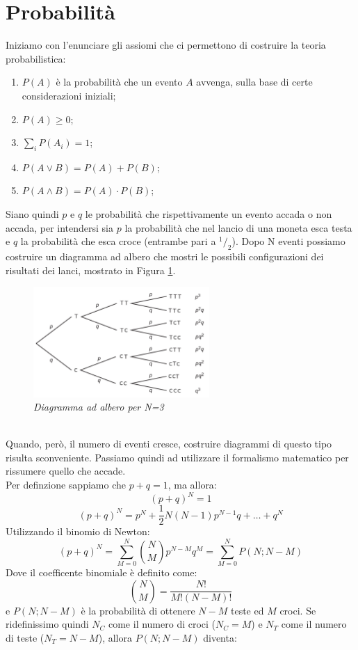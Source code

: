 \section{Probabilità}

Iniziamo con l'enunciare gli assiomi che ci permettono di costruire la teoria probabilistica:
\begin{enumerate}
    \item $P(A)$ è la probabilità che un evento $A$ avvenga, sulla base di certe considerazioni iniziali;
    \item $P(A)\geq 0$;
    \item $\sum_i P(A_i) = 1$;
    \item $P(A \lor B) = P(A) + P(B)$;
    \item $P(A \land B) = P(A) \cdot P(B)$;
\end{enumerate}
Siano quindi $p$ e $q$ le probabilità che rispettivamente un evento accada o non accada, per intendersi sia $p$ la probabilità che nel lancio di una moneta esca testa e $q$ la probabilità che esca croce (entrambe pari a $ ^1/_2$). Dopo N eventi possiamo costruire un diagramma ad albero che mostri le possibili configurazioni dei risultati dei lanci, mostrato in Figura \ref{Fig1}.
\begin{figure}[!h]
    \centering
    \includegraphics[width = 6.7cm]{../figs/img1}
    \caption{\textit{Diagramma ad albero per N=3}}
    \label{Fig1}
\end{figure}
\\
Quando, però, il numero di eventi cresce, costruire diagrammi di questo tipo risulta sconveniente. Passiamo quindi ad utilizzare il formalismo matematico per rissumere quello che accade.
\\Per definzione sappiamo che $p + q = 1$, ma allora:
$$(p+q)^N = 1$$
$$(p+q)^N = p^N + \frac{1}{2}N(N-1)p^{N-1}q + \dots + q^N$$
Utilizzando il binomio di Newton:
$$(p+q)^N = \sum_{M=0}^N \binom{N}{M} p^{N-M}q^M = \sum_{M=0}^N P(N;N-M)$$
Dove il coefficente binomiale è definito come:
$$\binom{N}{M} = \frac{N!}{M!(N-M)!}$$
e $P(N;N-M)$ è la probabilità di ottenere $N-M$ teste ed $M$ croci. Se ridefinissimo quindi $N_C$ come il numero di croci ($N_C = M$) e $N_T$ come il numero di teste ($N_T = N-M$), allora $P(N;N-M)$ diventa:
